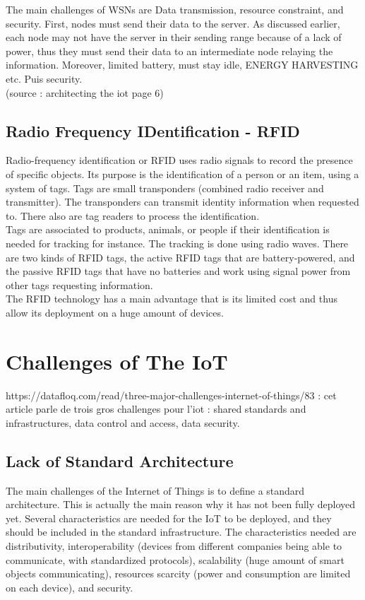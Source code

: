 The main challenges of WSNs are Data transmission, resource constraint, and security. First, nodes must send their data to the server. As discussed earlier, each node may not have the server in their sending range because of a lack of power, thus they must send their data to an intermediate node relaying the information. Moreover, limited battery, must stay idle, ENERGY HARVESTING etc. Puis security.\\

(source : architecting the iot page 6)
\subsection{Radio Frequency IDentification - RFID}

Radio-frequency identification or RFID uses radio signals to record the presence of specific objects. Its purpose is the identification of a person or an item, using a system of tags. Tags are small transponders (combined radio receiver and transmitter). The transponders can transmit identity information when requested to. There also are tag readers to process the identification.\\

Tags are associated to products, animals, or people if their identification is needed for tracking for instance. The tracking is done using radio waves. There are two kinds of RFID tags, the active RFID tags that are battery-powered, and the passive RFID tags that have no batteries and work using signal power from other tags requesting information.\\

The RFID technology has a main advantage that is its limited cost and thus allow its deployment on a huge amount of devices.
\section{Challenges of The IoT}

https://datafloq.com/read/three-major-challenges-internet-of-things/83 : cet article parle de trois gros challenges pour l'iot : shared standards and infrastructures, data control and access, data security.\\

\subsection{Lack of Standard Architecture}

The main challenges of the Internet of Things is to define a standard architecture. This is actually the main reason why it has not been fully deployed yet. Several characteristics are needed for the IoT to be deployed, and they should be included in the standard infrastructure. The characteristics needed are distributivity, interoperability (devices from different companies being able to communicate, with standardized protocols), scalability (huge amount of smart objects communicating), resources scarcity (power and consumption are limited on each device), and security.\\

